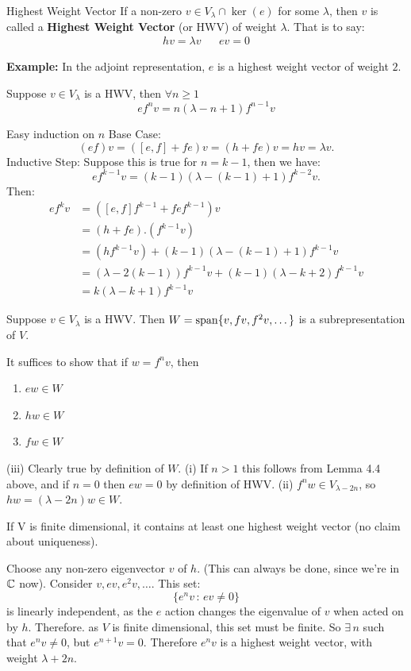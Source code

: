 \documentclass{article}
\begin{document}
\begin{fancydefine}{Highest Weight Vector}
    If a non-zero $v \in V_{\lambda} \cap \ker(e)$ for some $\lambda$, then $v$ is called a \textbf{Highest Weight Vector} (or HWV) of weight $\lambda$. That is to say: \begin{align*}
    hv = \lambda v & & ev=0
\end{align*}
\end{fancydefine} 
\textbf{Example: } In the adjoint representation, $e$ is a highest weight vector of weight $2$.
\begin{fancylem}{} Suppose $v \in V_{\lambda}$ is a HWV, then $\forall n \geq 1$ \[ ef^{n}v = n(\lambda-n+1)f^{n-1}v\]
\end{fancylem}
\proof Easy induction on $n$ \gap Base Case: \[ (ef)v = ([e,f] +fe)v = (h + fe)v = hv = \lambda v. \] 
Inductive Step: Suppose this is true for $n=k-1$, then we have: \[ ef^{k-1}v = (k-1)(\lambda-(k-1)+1)f^{k-2}v. \]
Then: \begin{align*} ef^{k}v&=([e,f]f^{k-1} + fef^{k-1})v\\
    &=(h + fe). (f^{k-1}v)\\
    &=  (hf^{k-1}v) + (k-1)(\lambda - (k-1) + 1)f^{k-1}v\\
    &= (\lambda - 2(k-1))f^{k-1}v + (k-1)(\lambda - k + 2)f^{k-1}v\\
    &=k(\lambda - k + 1)f^{k-1}v
\end{align*}
\endproof
\begin{fancylem}{}
    Suppose $v \in V_{\lambda}$ is a HWV. Then $W=\operatorname{span}\{v,fv,f^{2}v,\dots \}$ is a subrepresentation of $V$.
\end{fancylem}
\proof It suffices to show that if $w=f^{n}v$, then
    \begin{enumerate}
        \item[(i)] $ew \in W$
        \item[(ii)] $hw \in W$
        \item[(iii)] $fw \in W$  
    \end{enumerate}
(iii) Clearly true by definition of $W$. \gap (i) If $n>1$ this follows from Lemma 4.4 above, and if $n=0$ then $ew=0$ by definition of HWV. \gap (ii) $f^{n}w \in V_{\lambda -2n}$, so $hw = (\lambda-2n)w \in W$.
\endproof
\begin{fancyprop}{} If V is finite dimensional, it contains at least one highest weight vector (no claim about uniqueness).
\end{fancyprop}
\proof Choose any non-zero eigenvector $v$ of $h$. (This can always be done, since we're in $\mathbb{C}$ now). \gap Consider $v,ev,e^{2}v,\dots$. This set: \[ \{e^{n}v \, : \, ev \neq 0 \}\] is linearly independent, as the $e$ action changes the eigenvalue of $v$ when acted on by $h$. Therefore. as $V$ is finite dimensional, this set must be finite. So $\exists \, n$ such that $ e^{n}v \neq 0$, but $e^{n+1}v =0$. Therefore $e^{n}v$ is a highest weight vector, with weight $\lambda +2n$.
\end{document}
